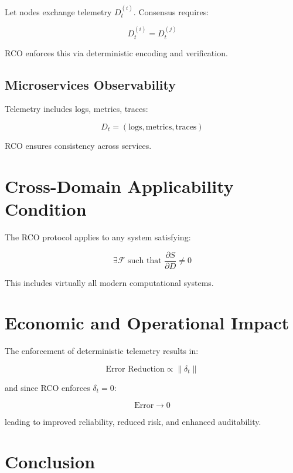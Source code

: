Let nodes exchange telemetry $D_t^{(i)}$. Consensus requires:

\begin{equation}
D_t^{(i)} = D_t^{(j)}
\end{equation}

RCO enforces this via deterministic encoding and verification.

\subsection{Microservices Observability}

Telemetry includes logs, metrics, traces:

\begin{equation}
D_t = (\text{logs}, \text{metrics}, \text{traces})
\end{equation}

RCO ensures consistency across services.

\section{Cross-Domain Applicability Condition}

The RCO protocol applies to any system satisfying:

\begin{equation}
\exists \mathcal{F} \text{ such that } \frac{\partial S}{\partial D} \neq 0
\end{equation}

This includes virtually all modern computational systems.

\section{Economic and Operational Impact}

The enforcement of deterministic telemetry results in:

\begin{equation}
\text{Error Reduction} \propto \|\delta_t\|
\end{equation}

and since RCO enforces $\delta_t = 0$:

\begin{equation}
\text{Error} \rightarrow 0
\end{equation}

leading to improved reliability, reduced risk, and enhanced auditability.

\section{Conclusion}

